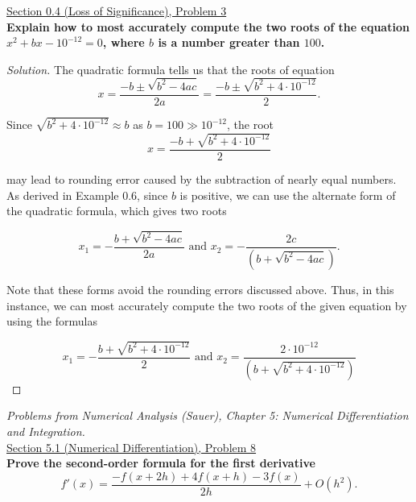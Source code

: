 \documentclass[11pt]{article}
\newenvironment{solution}
  {\renewcommand\qedsymbol{$\blacksquare$}\begin{proof}[Solution]}
  {\end{proof}}
\theoremstyle{definition}
\begin{document}
\newpage

\underline{Section 0.4 (Loss of Significance), Problem 3} \\

\textbf{Explain how to most accurately compute the two roots of the equation
$x^2+bx - 10^{-12} =0$, where $b$ is a number greater than $100$.}

\begin{solution}
The quadratic formula tells us that the roots of equation \[ x = \frac{-b \pm \sqrt{b^2 -4ac}}{2a} = \frac{-b \pm \sqrt{b^2 + 4\cdot 10^{-12}}}{2}.\]

Since $\sqrt{b^2 + 4 \cdot 10^{-12}} \approx b$ as $b = 100 \gg 10^{-12}$, the root \[ x = \frac{-b + \sqrt{b^2 + 4\cdot10^{-12}}}{2} \]

may lead to rounding error caused by the subtraction of nearly equal numbers. \\

As derived in Example 0.6, since $b$ is positive, we can use the alternate form of the quadratic formula, which gives two roots

\[ x_1 = -\frac{b + \sqrt{b^2 - 4ac}}{2a} \text { and  } x_2 = -\frac{2c}{(b + \sqrt{b^2 - 4ac})}. \]

Note that these forms avoid the rounding errors discussed above. Thus, in this instance, we can most accurately compute the two roots of the given equation by using the formulas

\[ \boxed{ x_1 = -\frac{b + \sqrt{b^2 + 4\cdot10^{-12}}}{2} \text { and  } x_2 = \frac{2\cdot 10^{-12}}{(b + \sqrt{b^2 + 4\cdot10^{-12}})} } \]
\end{solution}

\newpage

\textit{Problems from Numerical Analysis (Sauer), Chapter 5: Numerical Differentiation and Integration.} \\

\underline{Section 5.1 (Numerical Differentiation), Problem 8} \\

\textbf{Prove the second-order formula for the first derivative} 
\[ f'(x) = \frac{-f(x+2h) + 4f(x+h) - 3f(x)}{2h} + O(h^2). \]
\end{document}
